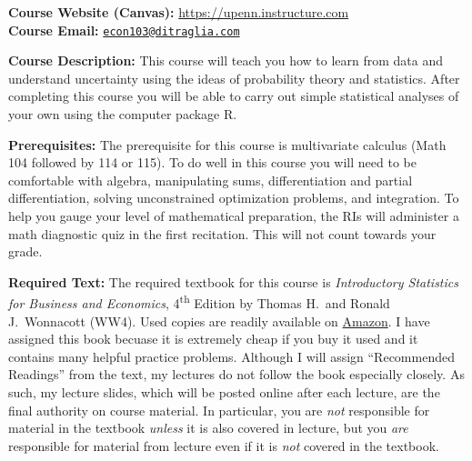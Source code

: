\documentclass[11pt, letterpaper]{article}
\begin{document}
\medskip

 
\noindent \textbf{Course Website (Canvas):} \url{https://upenn.instructure.com}\\
\noindent \textbf{Course Email:} \href{mailto:econ103@ditraglia.com}{\texttt{econ103@ditraglia.com}}

\bigskip



\noindent \textbf{Course Description:} 
This course will teach you how to learn from data and understand uncertainty using the ideas of probability theory and statistics. 
After completing this course you will be able to carry out simple statistical analyses of your own using the computer package R.


\medskip

\noindent \textbf{Prerequisites:} 
The prerequisite for this course is multivariate calculus (Math 104 followed by 114 or 115). 
To do well in this course you will need to be comfortable with algebra, manipulating sums, differentiation and partial differentiation, solving unconstrained optimization problems, and integration. 
To help you gauge your level of mathematical preparation, the RIs will administer a math diagnostic quiz in the first recitation. 
This will not count towards your grade.




\medskip

\noindent \textbf{Required Text:} 
The required textbook for this course is \emph{Introductory Statistics for Business and Economics}, 4\textsuperscript{th} Edition by Thomas H.\ and Ronald J.\ Wonnacott (WW4). 
Used copies are readily available on \href{http://tinyurl.com/ECON103-2013A}{Amazon}.
I have assigned this book becuase it is extremely cheap if you buy it used and it contains many helpful practice problems.
Although I will assign ``Recommended Readings'' from the text, my lectures do not follow the book especially closely.
As such, my lecture slides, which will be posted online after each lecture, are the final authority on course material. 
In particular, you are \emph{not} responsible for material in the textbook \emph{unless} it is also covered in lecture, but you \emph{are} responsible for material from lecture even if it is \emph{not} covered in the textbook.

\medskip
\end{document}
